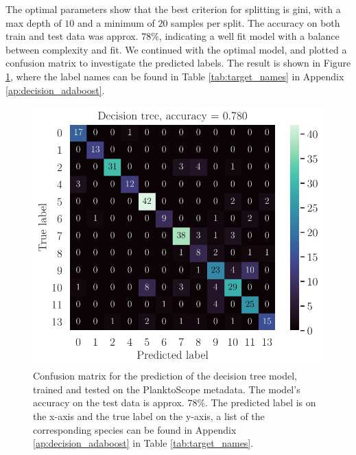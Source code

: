 The optimal parameters show that the best criterion for splitting is gini, with a max depth of $10$ and a minimum of $20$ samples per split. The accuracy on both train and test data was approx. $78\%$, indicating a well fit model with a balance between complexity and fit. 
We continued with the optimal model, and plotted a confusion matrix to investigate the predicted labels. The result is shown in Figure \ref{fig:cm_tree_metadata}, where the label names can be found in Table \ref{tab:target_names} in Appendix \ref{ap:decision_adaboost}.
\begin{figure}
    \centering
    \includegraphics[width=\linewidth]{latex/figures/cm_tree_planktoscope_metadata_labeled.pdf}
    \caption{Confusion matrix for the prediction of the decision tree model, trained and tested on the PlanktoScope metadata. The model's accuracy on the test data is approx. $78\%$. The predicted label is on the x-axis and the true label on the y-axis, a list of the corresponding species can be found in Appendix \ref{ap:decision_adaboost} in Table \ref{tab:target_names}.}
    \label{fig:cm_tree_metadata}
\end{figure}

